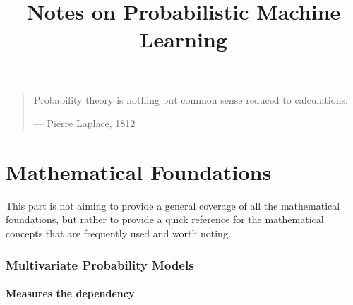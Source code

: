 \documentclass[11pt]{article}
\begin{document}
\title{Notes on Probabilistic Machine Learning}
\author{}
\date{}
\maketitle

\begin{quote}
{\Large
  Probability theory is nothing but common sense reduced to calculations.
  \begin{flushright}
    --- Pierre Laplace, 1812
  \end{flushright}
}
\end{quote}

\tableofcontents
\newpage


\clearpage
\part{Mathematical Foundations}
This part is not aiming to provide a general coverage of all the mathematical foundations, but rather to provide a quick reference for the mathematical concepts that are frequently used and worth noting.

\section{Multivariate Probability Models}

\subsection{Measures the dependency}
\end{document}
